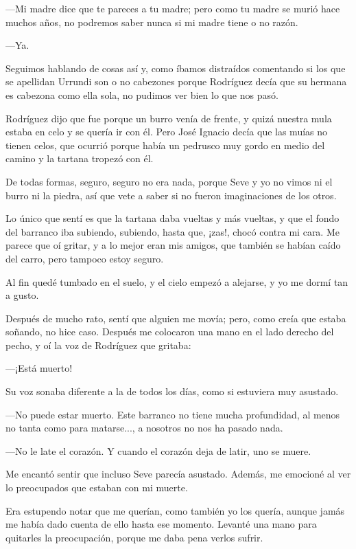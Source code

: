 \documentclass{barcodevapor3pags}
\begin{document}
---Mi madre dice que te pareces a tu madre; pero como tu madre se murió
hace muchos años, no podremos saber nunca si mi madre tiene o no razón.~

---Ya.~

Seguimos hablando de cosas así y, como íbamos distraídos comentando si
los que se apellidan Urrundi son o no cabezones porque Rodríguez decía
que su hermana es cabezona como ella sola, no pudimos ver bien lo que
nos pasó.~

Rodríguez dijo que fue porque un burro venía de frente, y quizá nuestra
mula estaba en celo y se quería ir con él. Pero José Ignacio decía que
las muías no tienen celos, que ocurrió porque había un pedrusco muy
gordo en medio del camino y la tartana tropezó con él.~

De todas formas, seguro, seguro no era nada, porque Seve y yo no vimos
ni el burro ni la piedra, así que vete a saber si no fueron
imaginaciones de los otros.~

Lo único que sentí es que la tartana daba vueltas y más vueltas, y que
el fondo del barranco iba subiendo, subiendo, hasta que, ¡zas!, chocó
contra mi cara. Me parece que oí gritar, y a lo mejor eran mis amigos,
que también se habían caído del carro, pero tampoco estoy seguro.~

Al fin quedé tumbado en el suelo, y el cielo empezó a alejarse, y yo me
dormí tan a gusto.~

Después de mucho rato, sentí que alguien me movía; pero, como creía que
estaba soñando, no hice caso. Después me colocaron una mano en el lado
derecho del pecho, y oí la voz de Rodríguez que gritaba:~

---¡Está muerto!~

Su voz sonaba diferente a la de todos los días, como si estuviera muy
asustado.~

---No puede estar muerto. Este barranco no tiene mucha profundidad, al
menos no tanta como para matarse..., a nosotros no nos ha pasado nada.~

---No le late el corazón. Y cuando el corazón deja de latir, uno se
muere.~

Me encantó sentir que incluso Seve parecía asustado. Además, me emocioné
al ver lo preocupados que estaban con mi muerte.~

Era estupendo notar que me querían, como también yo los quería, aunque
jamás me había dado cuenta de ello hasta ese momento. Levanté una mano
para quitarles la preocupación, porque me daba pena verlos sufrir.~
\end{document}

